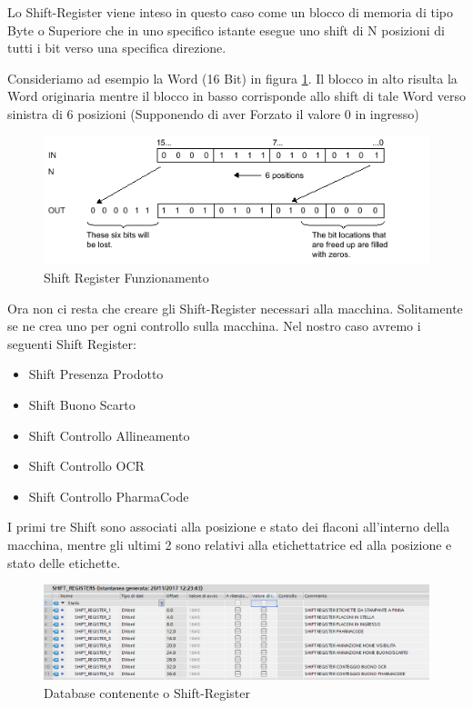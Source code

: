 \documentclass[12pt, a4paper, oneside]{book}
\begin{document}
Lo Shift-Register viene inteso in questo caso come un blocco di memoria di tipo Byte o Superiore che in uno specifico istante esegue uno shift di N posizioni di tutti i bit verso una specifica direzione.

Consideriamo ad esempio la Word (16 Bit) in figura \ref{sh1}. Il blocco in alto risulta la Word originaria mentre il blocco in basso corrisponde allo shift di tale Word verso sinistra di 6 posizioni (Supponendo di aver Forzato il valore 0 in ingresso)

\begin{figure}[H]
	\centering
	\includegraphics[width=12cm]{Immagini/SH1}
	\caption{ Shift Register Funzionamento}
	\label{sh1}
\end{figure}

Ora non ci resta che creare gli Shift-Register necessari alla macchina. Solitamente se ne crea uno per ogni controllo sulla macchina. Nel nostro caso avremo i seguenti Shift Register:
\begin{itemize}
	\item Shift Presenza Prodotto
	\item Shift Buono Scarto
	\item Shift Controllo Allineamento
	\item Shift Controllo OCR
	\item Shift Controllo PharmaCode
\end{itemize}

I primi tre Shift sono associati alla posizione e stato dei flaconi all'interno della macchina, mentre gli ultimi 2 sono relativi alla etichettatrice ed alla posizione e stato delle etichette.

\begin{figure}[H]
	\centering
	\includegraphics[width=12cm]{Immagini/SH8}
	\caption{ Database contenente o Shift-Register}
	\label{sh8}
\end{figure}
\end{document}
